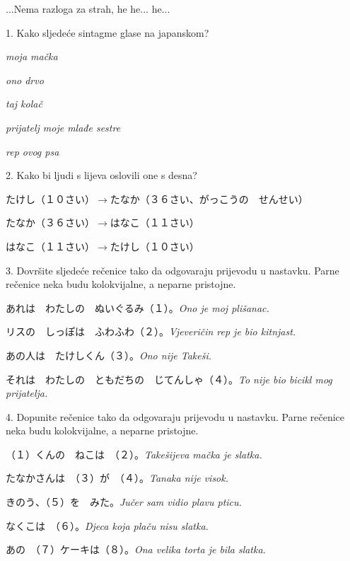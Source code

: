 
\author{Marko Miličić, Tomislav Mamić}

	
	...Nema razloga za strah, he he... he...
	
	\begin{mondai}{1. Kako sljedeće sintagme glase na japanskom?}
		\item \textit{moja mačka}
		\item \textit{ono drvo}
		\item \textit{taj kolač}
		\item \textit{prijatelj moje mlađe sestre}
		\item \textit{rep ovog psa}
	\end{mondai}

	\begin{mondai}{2. Kako bi ljudi s lijeva oslovili one s desna?}
		\item たけし（１０さい）$\rightarrow$たなか（３６さい、がっこうの　せんせい）
		\item たなか（３６さい）$\rightarrow$はなこ（１１さい）
		\item はなこ（１１さい）$\rightarrow$たけし（１０さい）
		
	\end{mondai}

	\begin{mondai}{3. Dovršite sljedeće rečenice tako da odgovaraju prijevodu u nastavku. Parne rečenice neka budu kolokvijalne, a neparne pristojne.}
		\item あれは　わたしの　ぬいぐるみ（１）。\textit{Ono je moj plišanac.}
		\item リスの　しっぽは　ふわふわ（２）。\textit{Vjeveričin rep je bio kitnjast.}
		\item あの人は　たけしくん（３）。\textit{Ono nije Takeši.}
		\item それは　わたしの　ともだちの　じてんしゃ（４）。\textit{To nije bio bicikl mog prijatelja.}
	\end{mondai}

	\begin{mondai}{4. Dopunite rečenice tako da odgovaraju prijevodu u nastavku. Parne rečenice neka budu kolokvijalne, a neparne pristojne.}
		\item （１）くんの　ねこは　（２）。\textit{Takešijeva mačka je slatka.}
		\item たなかさんは　（３）が　（４）。\textit{Tanaka nije visok.}
		\item きのう、（５）を　みた。\textit{Jučer sam vidio plavu pticu.}
		\item なくこは　（６）。\textit{Djeca koja plaču nisu slatka.}
		\item あの　（７）ケーキは（８）。\textit{Ona velika torta je bila slatka.}
	\end{mondai}

